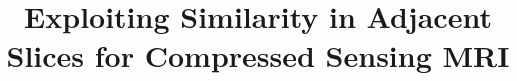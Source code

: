 \documentclass[11pt]{article}
\title{Exploiting Similarity in Adjacent Slices for
	Compressed Sensing MRI}
\begin{document}
	\maketitle 
	\par 
\end{document}
